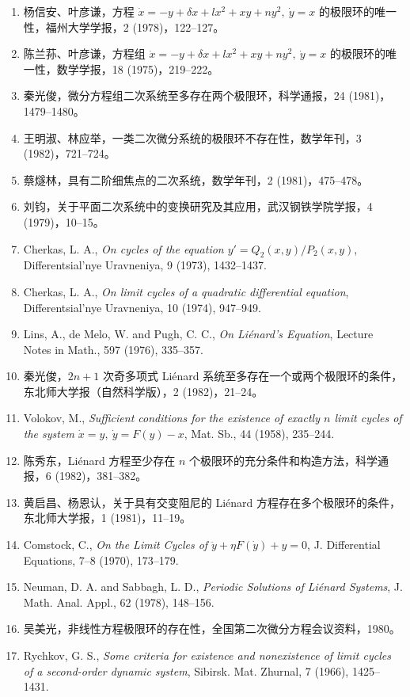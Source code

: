 \begin{enumerate}
\item 杨信安、叶彦谦，方程 $\dot x=-y+\delta x+lx^2+xy+ny^2,\ \dot y=x$ 的极限环的唯一性，福州大学学报，2 (1978)，122--127。
\item 陈兰荪、叶彦谦，方程组 $\dot x=-y+\delta x+lx^2+xy+ny^2,\ \dot y=x$ 的极限环的唯一性，数学学报，18 (1975)，219--222。
\item 秦光俊，微分方程组二次系统至多存在两个极限环，科学通报，24 (1981)，1479--1480。
\item 王明淑、林应举，一类二次微分系统的极限环不存在性，数学年刊，3 (1982)，721--724。
\item 蔡燧林，具有二阶细焦点的二次系统，数学年刊，2 (1981)，475--478。
\item 刘钧，关于平面二次系统中的变换研究及其应用，武汉钢铁学院学报，4 (1979)，10--15。
\item Cherkas, L. A., \emph{On cycles of the equation $y'=Q_2(x,y)/P_2(x,y)$}, Differentsial'nye Uravneniya, 9 (1973), 1432--1437.
\item Cherkas, L. A., \emph{On limit cycles of a quadratic differential equation}, Differentsial'nye Uravneniya, 10 (1974), 947--949.
\item Lins, A., de Melo, W. and Pugh, C. C., \emph{On Liénard's Equation}, Lecture Notes in Math., 597 (1976), 335--357.
\item 秦光俊，$2n+1$ 次奇多项式 Liénard 系统至多存在一个或两个极限环的条件，东北师大学报（自然科学版），2 (1982)，21--24。
\item Volokov, M., \emph{Sufficient conditions for the existence of exactly $n$ limit cycles of the system $\dot x=y,\ \dot y=F(y)-x$}, Mat. Sb., 44 (1958), 235--244.
\item 陈秀东，Liénard 方程至少存在 $n$ 个极限环的充分条件和构造方法，科学通报，6 (1982)，381--382。
\item 黄启昌、杨恩认，关于具有交变阻尼的 Liénard 方程存在多个极限环的条件，东北师大学报，1 (1981)，11--19。
\item Comstock, C., \emph{On the Limit Cycles of $\ddot y+\eta F(\dot y)+y=0$}, J. Differential Equations, 7--8 (1970), 173--179.
\item Neuman, D. A. and Sabbagh, L. D., \emph{Periodic Solutions of Liénard Systems}, J. Math. Anal. Appl., 62 (1978), 148--156.
\item 吴美光，非线性方程极限环的存在性，全国第二次微分方程会议资料，1980。
\item Rychkov, G. S., \emph{Some criteria for existence and nonexistence of limit cycles of a second-order dynamic system}, Sibirsk. Mat. Zhurnal, 7 (1966), 1425--1431.

\end{enumerate}
